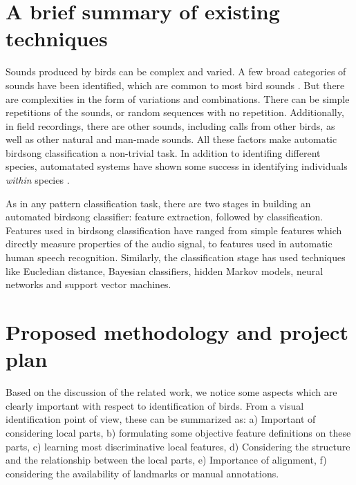 \documentclass{article}
\begin{document}
\section*{A brief summary of existing techniques}

Sounds produced by birds can be complex and varied. A few broad categories of
sounds have been identified, which are common to most bird sounds
\cite{brandes_automatedSoundRecording2008}. But there are complexities in the
form of variations and combinations. There can be simple repetitions of the
sounds, or random sequences with no repetition.  Additionally, in field
recordings, there are other sounds, including calls from other birds, as well as
other natural and man-made sounds. All these factors make automatic birdsong
classification a non-trivial task. In addition to identifing different species,
automatated systems have shown some success in identifying individuals
\emph{within} species \cite{kirschel_territorial2011}.

As in any pattern classification task, there are two stages in building an
automated birdsong classifier: feature extraction, followed by classification.
Features used in birdsong classification have ranged from simple features which
directly measure properties of the audio signal, to features used in automatic
human speech recognition. Similarly, the classification stage has used
techniques like Eucledian distance, Bayesian classifiers, hidden Markov models, neural networks and support vector machines.




\section{Proposed methodology and project plan}

Based on the discussion of the related work, we notice some aspects which are clearly important with respect to identification of birds. From a visual identification point of view, these can be summarized as: a) Important of considering local parts, b) formulating some objective feature definitions on these parts, c) learning most discriminative local features, d) Considering the structure and the relationship between the local parts, e) Importance of alignment, f) considering the availability of landmarks or manual annotations. 
\end{document}
